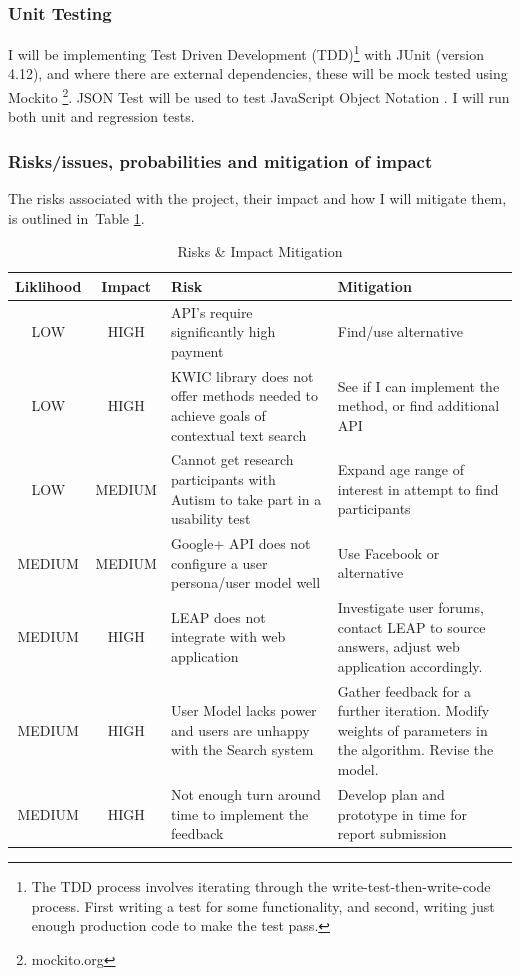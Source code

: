 \documentclass[a4paper, 10pt]{article}
\begin{document}
\subsubsection{Unit Testing}
I will be implementing Test Driven Development (TDD)\footnote{The TDD process involves iterating through the write-test-then-write-code process. First writing a test for some functionality, and second, writing just enough production code to make the test pass.} with JUnit (version 4.12), and where there are external dependencies, these will be mock tested using Mockito \footnote{mockito.org}. JSON Test will be used to test JavaScript Object Notation \cite{jsontest}. I will run both unit and regression tests.

\subsubsection{Risks/issues, probabilities and mitigation of impact}
The risks associated with the project, their impact and how I will mitigate them, is outlined in~Table \ref{risks}. 
\begin{table}[H]
\caption{Risks \& Impact Mitigation} 
\centering
\begin{tabular}{|c | c | p{5cm} | p{5cm} |}
\hline\hline 
Liklihood & Impact & Risk & Mitigation\\ [0.5ex]
\hline 
LOW & HIGH & API's require significantly high payment & Find/use alternative\\
\hline 
LOW & HIGH & KWIC library does not offer methods needed to achieve goals of contextual text search & See if I can implement the method, or find additional API\\
\hline 
LOW & MEDIUM & Cannot get research participants with Autism to take part in a usability test & Expand age range of interest in attempt to find participants\\ 
\hline 
MEDIUM & MEDIUM & Google+ API does not configure a user persona/user model well & Use Facebook or alternative\\
\hline 
MEDIUM & HIGH & LEAP does not integrate with web application & Investigate user forums, contact LEAP to source answers, adjust web application accordingly.\\
\hline
MEDIUM & HIGH & User Model lacks power and users are unhappy with the Search system & Gather feedback for a further iteration. Modify weights of parameters in the algorithm. Revise the model. \\
\hline
MEDIUM & HIGH & Not enough turn around time to implement the feedback & Develop plan and prototype in time for report submission\\[1ex]
\hline
\end{tabular}
\label{risks} 
\end{table}
\end{document}
